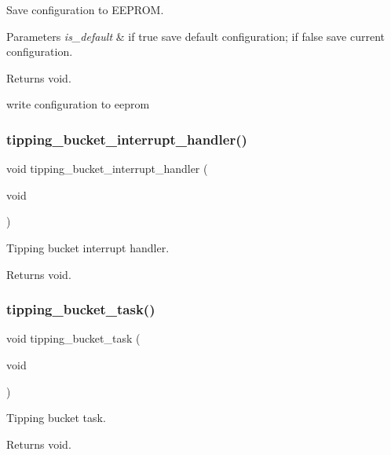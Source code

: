 Save configuration to E\+E\+P\+R\+OM. 


\begin{DoxyParams}{Parameters}
{\em is\+\_\+default} & if true save default configuration; if false save current configuration. \\
\hline
\end{DoxyParams}
\begin{DoxyReturn}{Returns}
void. 
\end{DoxyReturn}
write configuration to eeprom \mbox{\label{i2c-rain_8h_a7fcfeb4fd75663ddccc79030c37d68b9}} 
\subsubsection{\texorpdfstring{tipping\+\_\+bucket\+\_\+interrupt\+\_\+handler()}{tipping\_bucket\_interrupt\_handler()}}
{\footnotesize\ttfamily void tipping\+\_\+bucket\+\_\+interrupt\+\_\+handler (\begin{DoxyParamCaption}\item[{void}]{ }\end{DoxyParamCaption})}



Tipping bucket interrupt handler. 

\begin{DoxyReturn}{Returns}
void. 
\end{DoxyReturn}
\mbox{\label{i2c-rain_8h_a8fcd3e091d63c9caff82b8bc3398c279}} 
\subsubsection{\texorpdfstring{tipping\+\_\+bucket\+\_\+task()}{tipping\_bucket\_task()}}
{\footnotesize\ttfamily void tipping\+\_\+bucket\+\_\+task (\begin{DoxyParamCaption}\item[{void}]{ }\end{DoxyParamCaption})}



Tipping bucket task. 

\begin{DoxyReturn}{Returns}
void. 
\end{DoxyReturn}
